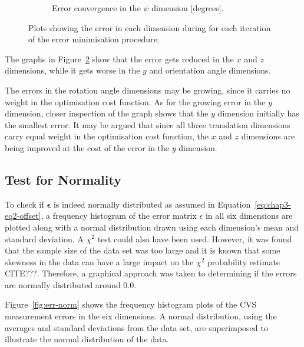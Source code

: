 \begin{figure}
\begin{subfigure}{0.45\textwidth}
    \caption{Error convergence in the $\psi$ dimension [degrees].}
\label{fig:err-convergence-psi}
  \end{subfigure}
  \caption[Plots showing error convergence for the optimsation procedure.]{Plots showing the error in each dimension during for each iteration of the error minimisation procedure.}
  \label{fig:err-convergence}
\end{figure}

The graphs in Figure~\ref{fig:err-convergence} show that the error gets reduced in the $x$ and $z$ dimensions, while it gets worse in the $y$ and orientation angle dimensions. 

The errors in the rotation angle dimensions may be growing, since it carries no weight in the optimisation cost function. As for the growing error in the $y$ dimension, closer inspection of the graph shows that the $y$ dimension initially has the smallest error. It may be argued that since all three translation dimensions carry equal weight in the optimisation cost function, the $x$ and $z$ dimensions are being improved at the cost of the error in the $y$ dimension. 

\subsection{Test for Normality}
\label{sec:err-norm-test}

To check if $\bm{\epsilon}$ is indeed normally distributed as assumed in Equation~\ref{eq:chap3-eq2-offset}, a frequency histogram of the error matrix $\epsilon$ in all six dimensions are plotted along with a normal distribution drawn using each dimension's mean and standard deviation. A $\chi^2$ test could also have been used. However, it was found that the sample size of the data set was too large and it is known that some skewness in the data can have a large impact on the $\chi^2$ probability estimate CITE???. Therefore, a graphical approach was taken to determining if the errors are normally distributed around 0.0. 

Figure~\ref{fig:err-norm} shows the frequency histogram plots of the CVS measurement errors in the six dimensions. A normal distribution, using the averages and standard deviations from the data set, are superimposed to illustrate the normal distribution of the data.

